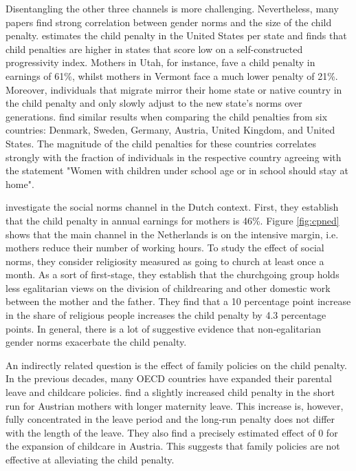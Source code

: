 \documentclass[10pt]{article}
\begin{document}
Disentangling the other three channels is more challenging. Nevertheless, many papers find strong correlation between gender norms and the size of the child penalty. \cite{kleven2023child} estimates the child penalty in the United States per state and finds that child penalties are higher in states that score low on a self-constructed progressivity index. Mothers in Utah, for instance, fave a child penalty in earnings of 61\%, whilst mothers in Vermont face a much lower penalty of 21\%. Moreover, individuals that migrate mirror their home state or native country in the child penalty and only slowly adjust to the new state's norms over generations. \cite{kleven2019child} find similar results when comparing the child penalties from six countries: Denmark, Sweden, Germany, Austria, United Kingdom, and United States. The magnitude of the child penalties for these countries correlates strongly with the fraction of individuals in the respective country agreeing with the statement "Women with children under school age or in school should stay at home".

\cite{rabate2022determines} investigate the social norms channel in the Dutch context. First, they establish that the child penalty in annual earnings for mothers is 46\%. Figure \ref{fig:cpned} shows that the main channel in the Netherlands is on the intensive margin, i.e. mothers reduce their number of working hours. To study the effect of social norms, they consider religiosity measured as going to church at least once a month. As a sort of first-stage, they establish that the churchgoing group holds less egalitarian views on the division of childrearing and other domestic work between the mother and the father. They find that a 10 percentage point increase in the share of religious people increases the child penalty by 4.3 percentage points. In general, there is a lot of suggestive evidence that non-egalitarian gender norms exacerbate the child penalty.

An indirectly related question is the effect of family policies on the child penalty. In the previous decades, many OECD countries have expanded their parental leave and childcare policies. \cite{kleven2020family} find a slightly increased child penalty in the short run for Austrian mothers with longer maternity leave. This increase is, however, fully concentrated in the leave period and the long-run penalty does not differ with the length of the leave. They also find a precisely estimated effect of 0 for the expansion of childcare in Austria. This suggests that family policies are not effective at alleviating the child penalty.
\end{document}
